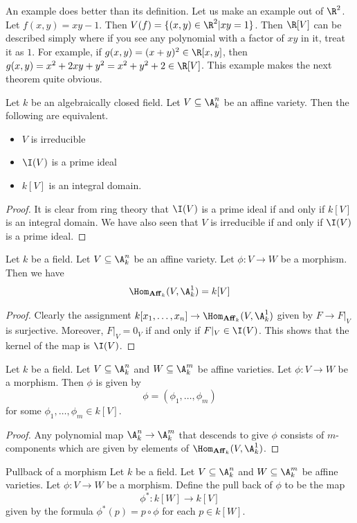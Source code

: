 \documentclass[a4paper]{article}
\begin{document}
An example does better than its definition. Let us make an example out of $\R^2$. Let $f(x,y)=xy-1$. Then $V(f)=\{(x,y)\in\R^2|xy=1\}$. Then $\R[V]$ can be described simply where if you see any polynomial with a factor of $xy$ in it, treat it as $1$. For example, if $g(x,y)=(x+y)^2\in\R[x,y]$, then $g(x,y)=x^2+2xy+y^2=x^2+y^2+2\in\R[V]$. This example makes the next theorem quite obvious. 

\begin{prp}{}{} Let $k$ be an algebraically closed field. Let $V\subseteq\A_k^n$ be an affine variety. Then the following are equivalent. 
\begin{itemize}
\item $V$ is irreducible
\item $\I(V)$ is a prime ideal
\item $k[V]$ is an integral domain. 
\end{itemize}
\begin{proof}
It is clear from ring theory that $\I(V)$ is a prime ideal if and only if $k[V]$ is an integral domain. We have also seen that $V$ is irreducible if and only if $\I(V)$ is a prime ideal. 
\end{proof}
\end{prp}

\begin{prp}{}{} Let $k$ be a field. Let $V\subseteq\A_k^n$ be an affine variety. Let $\phi:V\to W$ be a morphism. Then we have $$\Hom_{\bold{Aff}_k}(V,\A_k^1)=k[V]$$ 
\begin{proof}
Clearly the assignment $k[x_1,\dots,x_n]\to\Hom_{\bold{Aff}_k}(V,\A_k^1)$ given by $F\to F|_V$ is surjective. Moreover, $F|_V=0_V$ if and only if $F|_V\in\I(V)$. This shows that the kernel of the map is $\I(V)$. 
\end{proof}
\end{prp}

\begin{lmm}{}{} Let $k$ be a field. Let $V\subseteq\A_k^n$ and $W\subseteq\A_k^m$ be affine varieties. Let $\phi:V\to W$ be a morphism. Then $\phi$ is given by $$\phi=(\phi_1,\dots,\phi_m)$$ for some $\phi_1,\dots,\phi_m\in k[V]$. 
\begin{proof}
Any polynomial map $\A_k^n\to\A_k^m$ that descends to give $\phi$ consists of $m$-components which are given by elements of $\Hom_{\bold{Aff}_k}(V,\A_k^1)$. 
\end{proof}
\end{lmm}

\begin{defn}{Pullback of a morphism}{} Let $k$ be a field. Let $V\subseteq\A_k^n$ and $W\subseteq\A_k^m$ be affine varieties. Let $\phi:V\to W$ be a morphism. Define the pull back of $\phi$ to be the map $$\phi^\ast:k[W]\to k[V]$$ given by the formula $\phi^\ast(p)=p\circ\phi$ for each $p\in k[W]$. 
\end{defn}
\end{document}
